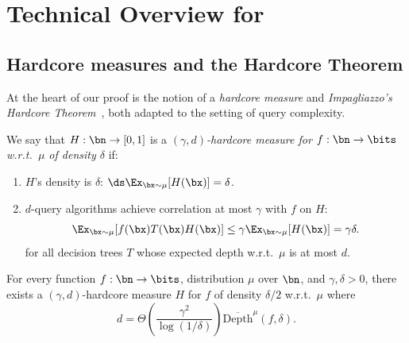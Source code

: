 \section{Technical Overview for~} 
\label{sec:tech-overview}


\subsection{Hardcore measures and the Hardcore Theorem} 

At the heart of our proof is the notion of a {\sl hardcore measure} and {\sl Impagliazzo’s Hardcore Theorem}~\cite{Imp95}, both adapted to the setting of query complexity.  

\begin{definition} 
\label{def:hardcore measure} 
We say that $H : \bn \to [0,1]$ is a {\sl $(\gamma,d)$-hardcore measure for $f : \bn \to \bits$ w.r.t.~$\mu$ of density $\delta$} if:
\begin{enumerate} 
\item $H$'s density is $\delta$: $\ds\Ex_{\bx\sim \mu}[H(\bx)] = \delta$. 
\item $d$-query algorithms achieve correlation at most $\gamma$ with $f$ on $H$:%
\[ \Ex_{\bx\sim \mu}[f(\bx)T(\bx)H(\bx)] \le \gamma \Ex_{\bx \sim \mu}[H(\bx)] = \gamma \delta.\]
for all decision trees $T$ whose expected depth w.r.t.~$\mu$ is at most $d$.
\end{enumerate}
\end{definition}


\begin{theorem}
    \label{thm:hardcore theorem for DTs}
For every function $f : \bn\to\bits$, distribution $\mu$ over $\bn$, and $\gamma,\delta > 0$, there exists a $(\gamma,d)$-hardcore measure $H$ for $f$ of density $\delta/2$ w.r.t.~$\mu$ where 
\[ d = \Theta\left(\frac{\gamma^2}{\log(1/\delta)}\right)  \overline{\mathrm{Depth}}^\mu(f,\delta). \]
\end{theorem}


